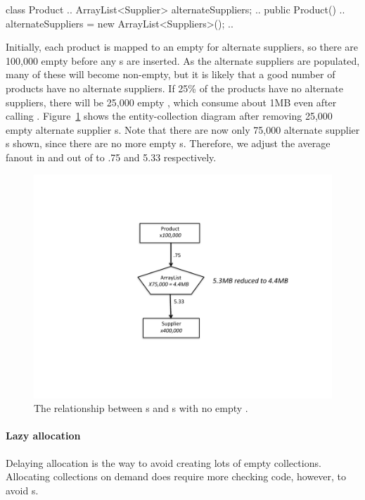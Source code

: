 \begin{shortlisting} 
class Product {
	.. 
	ArrayList<Supplier> alternateSuppliers;
	..
	public Product() {
		..
		alternateSuppliers = new ArrayList<Suppliers>();
		..
	}
}
\end{shortlisting}
Initially, each product is mapped to an empty  for alternate
suppliers, so there are 100,000 empty  before any
s are inserted. As the alternate suppliers are populated, many
of these  will become non-empty, but it is likely that a good
number of products have no alternate suppliers. If 25\% of the products have no
alternate suppliers, there will be 25,000 empty , which consume
about 1MB even after calling .
Figure~\ref{fig:empty-array} shows the entity-collection
diagram after removing 25,000 empty alternate supplier s. Note
that there are now only 75,000 alternate supplier s shown,
since there are no more empty s. Therefore, we adjust the
average fanout in and out of  to .75 and
5.33 respectively.
\begin{figure}
  \centering
 \includegraphics[width=.80\textwidth]{part1/Figures/collections/empty-product.pdf}
 \caption{The relationship between s and s
  with no empty .}
  \label{fig:empty-array}
\end{figure}
 
 \paragraph{Lazy allocation} Delaying allocation is the way to avoid creating
 lots of empty collections.
 Allocating collections on demand does
 require more checking code, however, to avoid s.
 
